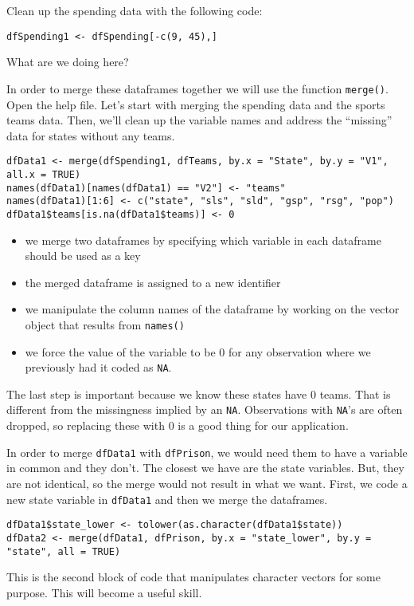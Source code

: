 Clean up the spending data with the following code:
\begin{verbatim}
dfSpending1 <- dfSpending[-c(9, 45),]
\end{verbatim}
What are we doing here?

In order to merge these dataframes together we will use the function
\texttt{merge()}. Open the help file. Let's start with merging the
spending data and the sports teams data. Then, we'll clean up the
variable names and address the ``missing'' data for states without any
teams. 

\begin{verbatim}
dfData1 <- merge(dfSpending1, dfTeams, by.x = "State", by.y = "V1", all.x = TRUE)
names(dfData1)[names(dfData1) == "V2"] <- "teams"
names(dfData1)[1:6] <- c("state", "sls", "sld", "gsp", "rsg", "pop")
dfData1$teams[is.na(dfData1$teams)] <- 0
\end{verbatim}

\begin{itemize}
\item we merge two dataframes by specifying which variable in each
  dataframe should be used as a key
\item the merged dataframe is assigned to a new identifier
\item we manipulate the column names of the dataframe by working on
  the vector object that results from \texttt{names()}
\item we force the value of the variable to be 0 for any observation
  where we previously had it coded as \texttt{NA}.
\end{itemize}

The last step is important because we know these states have 0
teams. That is different from the missingness implied by an
\texttt{NA}. Observations with \texttt{NA}'s are often dropped, so
replacing these with 0 is a good thing for our application.

In order to merge \texttt{dfData1} with \texttt{dfPrison}, we would
need them to have a variable in common and they don't. The closest we have are the
state variables. But, they are not identical, so the merge would not
result in what we want. First, we code a new state variable in
\texttt{dfData1} and then we merge the dataframes.
\begin{verbatim}
dfData1$state_lower <- tolower(as.character(dfData1$state))
dfData2 <- merge(dfData1, dfPrison, by.x = "state_lower", by.y = "state", all = TRUE)
\end{verbatim}
This is the second block of code that manipulates character vectors
for some purpose. This will become a useful skill.


